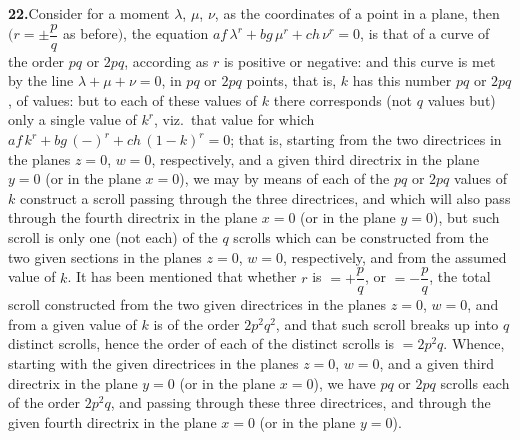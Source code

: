 \documentclass[11pt,a4paper]{article}
\begin{document}
\textbf{22.}\quad Consider for a moment $\lambda$, $\mu$, $\nu$, as the
coordinates of a point in a plane, then $\bigl(r = \pm\dfrac{p}{q}$ as before$\bigr)$,
the equation $af\,\lambda^{r} + bg\,\mu^{r} + ch\,\nu^{r} = 0$, is that of a
curve of the order $pq$ or $2pq$, according as $r$ is positive or negative: and
this curve is met by the line $\lambda + \mu + \nu = 0$, in $pq$ or $2pq$
points, that is, $k$ has this number $pq$ or $2pq$, of values: but to each of
these values of $k$ there corresponds (not $q$ values but) only a single value
of $k^{r}$, viz.\ that value for which $af\,k^{r} + bg\,(-)^{r} + ch\,(1 - k)^{r} = 0$;
that is, starting from the two directrices in the planes $z = 0$, $w = 0$,
respectively, and a given third directrix in the plane $y = 0$ (or in the
plane $x = 0$), we may by means of each of the $pq$ or $2pq$ values of $k$
construct a scroll passing through the three directrices, and which will also
pass through the fourth directrix in the plane $x = 0$ (or in the plane
$y = 0$), but such scroll is only one (not each) of the $q$ scrolls which can
be constructed from the two given sections in the planes $z = 0$, $w = 0$,
respectively, and from the assumed value of $k$. It has been mentioned that
whether $r$ is $= +\dfrac{p}{q}$, or $= -\dfrac{p}{q}$, the total scroll
constructed from the two given directrices in the planes $z = 0$, $w = 0$, and
from a given value of $k$ is of the order $2p^{2}q^{2}$, and that such scroll
breaks up into $q$ distinct scrolls, hence the order of each of the distinct
scrolls is $= 2p^{2}q$. Whence, starting with the given directrices in the
planes $z = 0$, $w = 0$, and a given third directrix in the plane $y = 0$ (or
in the plane $x = 0$), we have $pq$ or $2pq$ scrolls each of the order
$2p^{2}q$, and passing through these three directrices, and through the given
fourth directrix in the plane $x = 0$ (or in the plane $y = 0$).
\end{document}
